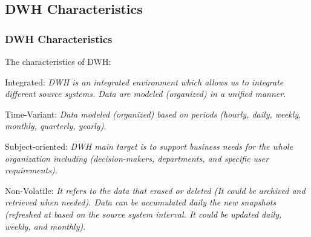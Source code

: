 
\VideoClassification[column=2, colour=red]
\subsection{DWH Characteristics}
\begin{frame}
    \frametitle{DWH Characteristics}
    \begin{wideitemize}
        \item The characteristics of DWH:
        \begin{wideitemize}
        	\item Integrated: \textit{DWH is an integrated environment which allows us to
        	integrate different source systems. Data are modeled (organized) in a unified manner}.%
        	
        	\item Time-Variant: \textit{Data modeled (organized) based on periods
        	(hourly, daily, weekly, monthly, quarterly, yearly)}.
        	
        	\item Subject-oriented: \textit{DWH main target is to support business needs for
        	the whole organization including (decision-makers, departments, and
        	specific user requirements)}.
        	
        	\item Non-Volatile: \textit{It refers to the data that erased or deleted (It could be archived and retrieved when needed). Data can be accumulated daily the new snapshots (refreshed at based on the source system interval.  \faArrowCircleORight \space It could be updated daily, weekly, and monthly)}.
        \end{wideitemize}
    \end{wideitemize}
\end{frame}
